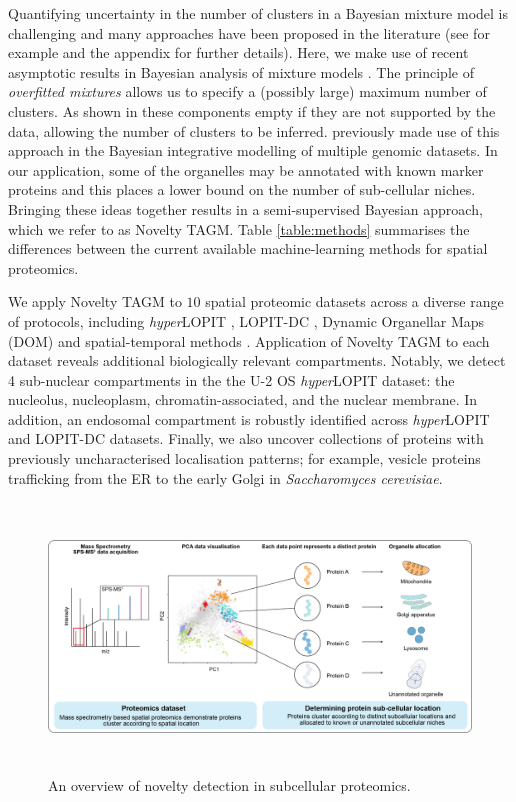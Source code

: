 \documentclass[12pt,english]{article}
\begin{document}
Quantifying uncertainty in the number of clusters in a Bayesian mixture model is challenging and many approaches have been proposed in the literature (see for example \cite{ferguson::1974, antoniak::1974, Richardson::1997} and the appendix for further details). Here, we make use of recent asymptotic results in Bayesian analysis of mixture models \citep{Rousseau::2011}. The principle of \textit{overfitted mixtures} allows us to specify a (possibly large) maximum number of clusters. As shown in \cite{Rousseau::2011} these components empty if they are not supported by the data, allowing the number of clusters to be inferred. \cite{Kirk:2012} previously made use of this approach in the Bayesian integrative modelling of multiple genomic datasets. In our application, some of the organelles may be annotated with known marker proteins and this places a lower bound on the number of sub-cellular niches. Bringing these ideas together results in a semi-supervised Bayesian approach, which we refer to as Novelty TAGM. Table \ref{table:methods} summarises the differences between the current available machine-learning methods for spatial proteomics.

We apply Novelty TAGM to $10$ spatial proteomic datasets across a diverse range of protocols, including \textit{hyper}LOPIT \citep{hyper, Mulvey:2017}, LOPIT-DC \citep{DC:2018}, Dynamic Organellar Maps (DOM) \citep{Itzhak:2016} and spatial-temporal methods \citep{Jean_Beltran:2016}. Application of Novelty TAGM to each dataset reveals additional biologically relevant compartments. Notably, we detect 4 sub-nuclear compartments in the the U-2 OS \textit{hyper}LOPIT dataset: the nucleolus,  nucleoplasm, chromatin-associated, and the nuclear membrane. In addition, an endosomal compartment is robustly identified across \textit{hyper}LOPIT and LOPIT-DC datasets. Finally, we also uncover collections of proteins with previously uncharacterised localisation patterns; for example, vesicle proteins trafficking from the ER to the early Golgi in \textit{Saccharomyces cerevisiae}.

\begin{figure}[h]
	
	\centering
	\includegraphics[height=2.8in]{IMG_Protein_Allocation_Draft_v2}
	\caption{An overview of novelty detection in subcellular proteomics.}
	\label{figure:overview}
\end{figure}
\end{document}
